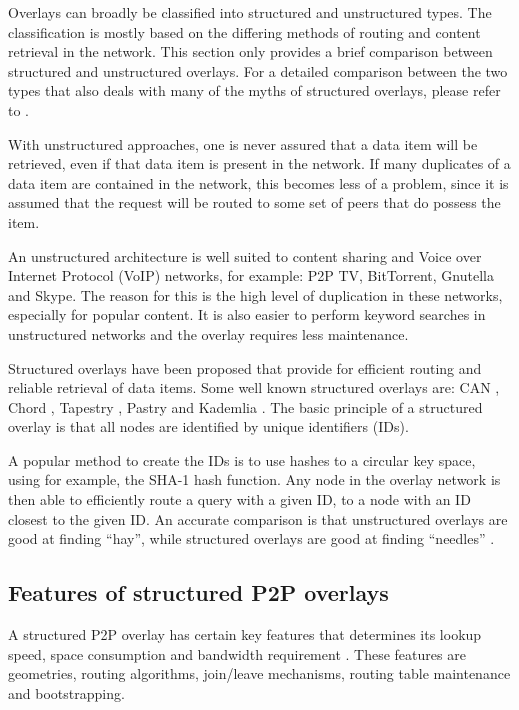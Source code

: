 Overlays can broadly be classified into structured and unstructured types. The classification is mostly based on the differing methods of routing and content retrieval in the network. This section only provides a brief comparison between structured and unstructured overlays. For a detailed comparison between the two types that also deals with many of the myths of structured overlays, please refer to \cite{Castro_structured_overlay_myths}.

With unstructured approaches, one is never assured that a data item will be retrieved, even if that data item is present in the network. If many duplicates of a data item are contained in the network, this becomes less of a problem, since it is assumed that the request will be routed to some set of peers that do  possess the item.

An unstructured architecture is well suited to content sharing and Voice over Internet Protocol (VoIP) networks, for example: P2P TV, BitTorrent, Gnutella and Skype. The reason for this is the high level of duplication in these networks, especially for popular content. It is also easier to perform keyword searches in unstructured networks and the overlay requires less maintenance.

Structured overlays have been proposed that provide for efficient routing and reliable retrieval of data items. Some well known structured overlays are: CAN \cite{CAN}, Chord \cite{chord}, Tapestry \cite{tapestry}, Pastry \cite{pastry} and Kademlia \cite{Kademlia_Maymounkov}. The basic principle of a structured overlay is that all nodes are identified by unique identifiers (IDs).

A popular method to create the IDs is to use hashes to a circular key space, using for example, the SHA-1 hash function. Any node in the overlay network is then able to efficiently route a query with a given ID, to a node with an ID closest to the given ID. An accurate comparison is that unstructured overlays are good at finding ``hay'', while structured overlays are good at finding ``needles'' \cite{Rodrigues_acm_comms_p2p}.

\subsection{Features of structured P2P overlays}
\label{structured_overlay_features}

A structured P2P overlay has certain key features that determines its lookup speed, space consumption and bandwidth requirement \cite{p2p_networking_handbook}. These features are geometries, routing algorithms, join/leave mechanisms, routing table maintenance and bootstrapping.

